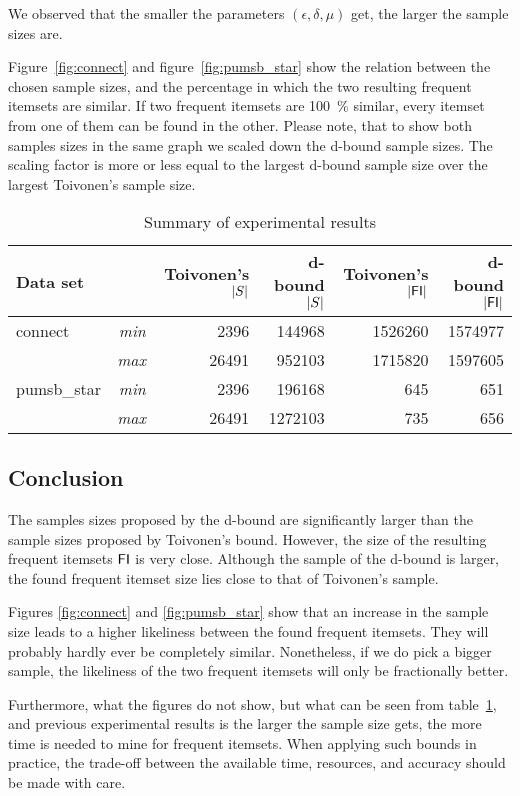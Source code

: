\documentclass[../main.tex]{subfiles}
\begin{document}
We observed that the smaller the parameters $(\epsilon, \delta, \mu)$ get,
the larger the sample sizes are.


Figure~\ref{fig:connect} and figure~\ref{fig:pumsb_star} show the relation between the chosen sample sizes,
and the percentage in which the two resulting frequent itemsets are similar.
If two frequent itemsets are \SI{100}{\percent} similar, every itemset from one of them can be found in the other.
Please note, that to show both samples sizes in the same graph we scaled down the d-bound sample sizes.
The scaling factor is more or less equal to the largest d-bound sample size over the largest Toivonen's sample size.

\begin{table}[h]
    \centering
    \begin{tabular}{l r r r r r}
        \hline
        Data set & & Toivonen's $\lvert S\rvert$ & d-bound $\lvert S\rvert$ & Toivonen's $\lvert\mathsf{FI}\rvert$ & d-bound $\lvert\mathsf{FI}\rvert$ \\
        \hline
        connect & \emph{min} & \num{2396}  & \num{144968} & \num{1526260} & \num{1574977} \\
                & \emph{max} & \num{26491} & \num{952103} & \num{1715820} & \num{1597605} \\
        \hline
        pumsb\_star & \emph{min} & \num{2396}  & \num{196168}  & \num{645} & \num{651} \\
                    & \emph{max} & \num{26491} & \num{1272103} & \num{735} & \num{656} \\
        \hline
    \end{tabular}
    \caption{Summary of experimental results}
    \label{tbl:results}
\end{table}


\subsection{Conclusion}
\label{sec:II_conclusion}

The samples sizes proposed by the d-bound are significantly larger than the sample sizes proposed by Toivonen's bound.
However, the size of the resulting frequent itemsets $\mathsf{FI}$ is very close.
Although the sample of the d-bound is larger, the found frequent itemset size lies close to that of Toivonen's sample.


Figures \ref{fig:connect} and \ref{fig:pumsb_star} show that an increase in the sample size leads to a higher likeliness between the found frequent itemsets.
They will probably hardly ever be completely similar.
Nonetheless, if we do pick a bigger sample, the likeliness of the two frequent itemsets will only be fractionally better.

Furthermore, what the figures do not show, but what can be seen from table~\ref{tbl:results},
and previous experimental results \cite{Goethals2003fimi, Borgelt2012} is the larger the sample size gets, the more time is needed to mine for frequent itemsets.
When applying such bounds in practice, the trade-off between the available time, resources, and accuracy should be made with care.
\end{document}
